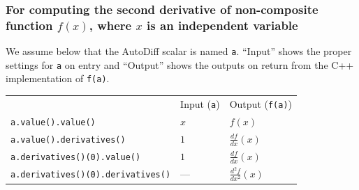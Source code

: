 \documentclass[letterpaper, 12 pt, onecolumn, journal]{IEEEtran}  %
\begin{document}
\subsubsection*{For computing the second derivative of non-composite function $f(x)$, where $x$ is an independent variable}
We assume below that the AutoDiff scalar is named \texttt{a}. ``Input'' shows the proper settings for \texttt{a} on entry and ``Output'' shows the outputs on return from the C++ implementation of \texttt{f(a)}.
\begin{center}
\begin{tabular}{lll}
 & Input (\texttt{a}) & Output (\texttt{f(a)}) \\
\texttt{a.value().value()} & $x$ & $f(x)$ \\
\texttt{a.value().derivatives()} & $1$ & $\frac{df}{dx}(x)$ \\
\texttt{a.derivatives()(0).value()} & $1$ & $\frac{df}{dx}(x)$\\
\texttt{a.derivatives()(0).derivatives()} & --- & $\frac{d^2f}{dx^2}(x)$
\end{tabular}
\end{center}
\end{document}
